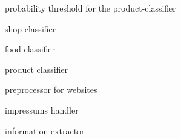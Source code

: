 \documentclass[letterpaper,10pt,english]{sphinxmanual}
\begin{document}
\begin{fulllineitems}
\begin{fulllineitems}
\label{\detokenize{api:worker.Worker._product_theta}}
probability threshold for the product-classifier

\end{fulllineitems}


\begin{fulllineitems}
\label{\detokenize{api:worker.Worker._shop_clf}}
shop classifier

\end{fulllineitems}


\begin{fulllineitems}
\label{\detokenize{api:worker.Worker._food_clf}}
food classifier

\end{fulllineitems}


\begin{fulllineitems}
\label{\detokenize{api:worker.Worker._product_clf}}
product classifier

\end{fulllineitems}


\begin{fulllineitems}
\label{\detokenize{api:worker.Worker._p}}
preprocessor for websites

\end{fulllineitems}


\begin{fulllineitems}
\label{\detokenize{api:worker.Worker._imp}}
impressums handler

\end{fulllineitems}


\begin{fulllineitems}
\label{\detokenize{api:worker.Worker._extractor}}
information extractor


\end{fulllineitems}
\end{fulllineitems}
\end{document}
